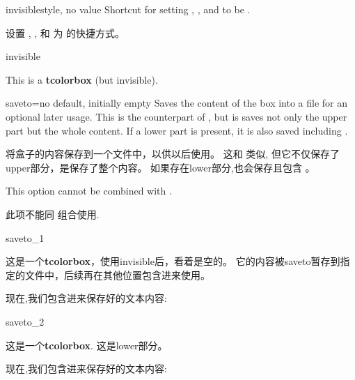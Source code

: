 \begin{docTcbKey}[][doc new and updated={2015-01-06}{2019-03-01}]{invisible}{}{style, no value}
Shortcut for setting , , and 
to be .

设置 , , 和  为  的快捷方式。
\begin{exdispExample}{invisible}
\begin{tcolorbox}[invisible]
This is a \textbf{tcolorbox} (but invisible).
\end{tcolorbox}
\end{exdispExample}
\end{docTcbKey}




\begin{docTcbKey}[][doc new=2015-05-04]{saveto}{=}{no default, initially empty}
Saves the content of the box into a file for an optional later usage.
This is the counterpart of , but is saves not
only the upper part but the whole content. If a lower part is present,
it is also saved including .

将盒子的内容保存到一个文件中，以供以后使用。
这和  类似, 但它不仅保存了upper部分，是保存了整个内容。
如果存在lower部分,也会保存且包含 。

\begin{marker}
This option cannot be combined with .

此项不能同  组合使用.
\end{marker}

\begin{exdispExample}{saveto_1}
\begin{tcolorbox}[invisible%
,saveto=\jobname_mysave1.tex
,colback=white]
这是一个\textbf{tcolorbox}，使用invisible后，看着是空的。
它的内容被saveto暂存到指定的文件中，后续再在其他位置包含进来使用。
\end{tcolorbox}

现在,我们包含进来保存好的文本内容:\\

\end{exdispExample}

\begin{exdispExample}{saveto_2}
\begin{tcolorbox}[saveto=\jobname_mysave2.tex]
这是一个\textbf{tcolorbox}.
\tcblower
这是lower部分。
\end{tcolorbox}

现在,我们包含进来保存好的文本内容:
\begin{tcolorbox}[colframe=red,colback=red!10,
coltitle=black,colbacktitle=red!20
,sidebyside%
,title=在这里我们看到保存的内容包括lower部分]

\end{tcolorbox}
\end{exdispExample}
\end{docTcbKey}
